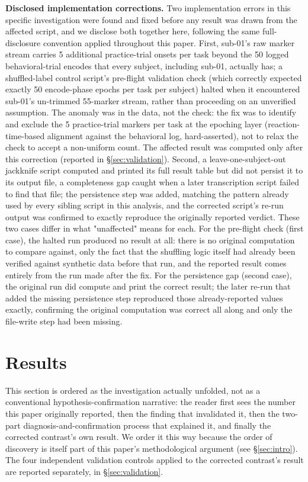 \documentclass[preprint,12pt]{elsarticle}
\begin{document}
\textbf{Disclosed implementation corrections.} Two implementation errors in this specific investigation were found and fixed before any result was drawn from the affected script, and we disclose both together here, following the same full-disclosure convention applied throughout this paper. First, sub-01's raw marker stream carries 5 additional practice-trial onsets per task beyond the 50 logged behavioral-trial encodes that every subject, including sub-01, actually has; a shuffled-label control script's pre-flight validation check (which correctly expected exactly 50 encode-phase epochs per task per subject) halted when it encountered sub-01's un-trimmed 55-marker stream, rather than proceeding on an unverified assumption. The anomaly was in the data, not the check: the fix was to identify and exclude the 5 practice-trial markers per task at the epoching layer (reaction-time-based alignment against the behavioral log, hard-asserted), not to relax the check to accept a non-uniform count. The affected result was computed only after this correction (reported in \S\ref{sec:validation}). Second, a leave-one-subject-out jackknife script computed and printed its full result table but did not persist it to its output file, a completeness gap caught when a later transcription script failed to find that file; the persistence step was added, matching the pattern already used by every sibling script in this analysis, and the corrected script's re-run output was confirmed to exactly reproduce the originally reported verdict. These two cases differ in what "unaffected" means for each. For the pre-flight check (first case), the halted run produced no result at all: there is no original computation to compare against, only the fact that the shuffling logic itself had already been verified against synthetic data before that run, and the reported result comes entirely from the run made after the fix. For the persistence gap (second case), the original run did compute and print the correct result; the later re-run that added the missing persistence step reproduced those already-reported values exactly, confirming the original computation was correct all along and only the file-write step had been missing.

\section{Results}\label{sec:results}

This section is ordered as the investigation actually unfolded, not as a conventional hypothesis-confirmation narrative: the reader first sees the number this paper originally reported, then the finding that invalidated it, then the two-part diagnosis-and-confirmation process that explained it, and finally the corrected contrast's own result. We order it this way because the order of discovery is itself part of this paper's methodological argument (see \S\ref{sec:intro}). The four independent validation controls applied to the corrected contrast's result are reported separately, in \S\ref{sec:validation}.
\end{document}
